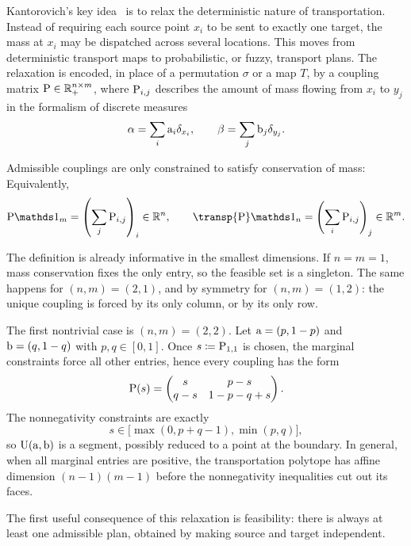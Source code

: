 Kantorovich's key idea~\cite{Kantorovich42} is to relax the deterministic nature of transportation. Instead of requiring each source point $x_i$ to be sent to exactly one target, the mass at $x_i$ may be dispatched across several locations. This moves from deterministic transport maps to probabilistic, or fuzzy, transport plans. The relaxation is encoded, in place of a permutation $\sigma$ or a map $T$, by a coupling matrix $\P\in\RR_+^{n\times m}$, where $\P_{i,j}$ describes the amount of mass flowing from $x_i$ to $y_j$ in the formalism of discrete measures
\[
	\al=\sum_i \a_i\de_{x_i},
	\qquad
	\be=\sum_j \b_j\de_{y_j}.
\]
\begin{defn}\label{def-discrete-couplings}
	Admissible couplings are only constrained to satisfy conservation of mass:
	Equivalently,
	\[
		\P\ones_m=\left(\sum_j \P_{i,j}\right)_i\in\RR^n,
		\qquad
		\transp{\P}\ones_n=\left(\sum_i \P_{i,j}\right)_j\in\RR^m.
	\]
\end{defn}
\begin{rem}\label{rem-small-transportation-polytopes}
	The definition is already informative in the smallest dimensions. If $n=m=1$, mass conservation fixes the only entry, so the feasible set is a singleton. The same happens for $(n,m)=(2,1)$, and by symmetry for $(n,m)=(1,2)$: the unique coupling is forced by its only column, or by its only row.

	The first nontrivial case is $(n,m)=(2,2)$. Let $\a=(p,1-p)$ and $\b=(q,1-q)$ with $p,q\in[0,1]$. Once $s\eqdef \P_{1,1}$ is chosen, the marginal constraints force all other entries, hence every coupling has the form
	\[
		\P(s)=
		\begin{pmatrix}
			s & p-s \\
			q-s & 1-p-q+s
		\end{pmatrix}.
	\]
	The nonnegativity constraints are exactly
	\[
		s\in\big[\max(0,p+q-1),\min(p,q)\big],
	\]
	so $\CouplingsD(\a,\b)$ is a segment, possibly reduced to a point at the boundary. In general, when all marginal entries are positive, the transportation polytope has affine dimension $(n-1)(m-1)$ before the nonnegativity inequalities cut out its faces.
\end{rem}
The first useful consequence of this relaxation is feasibility: there is always at least one admissible plan, obtained by making source and target independent.

